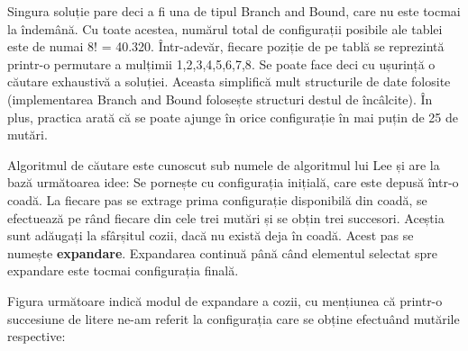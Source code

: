 \inputminted{pascal}{src/problem3-1.pas}

Singura soluție pare deci a fi una de tipul Branch and Bound, care nu este
tocmai la îndemână. Cu toate acestea, numărul total de configurații posibile
ale tablei este de numai 8! = 40.320. Într-adevăr, fiecare poziție de pe tablă
se reprezintă printr-o permutare a mulțimii {1,2,3,4,5,6,7,8}. Se poate face
deci cu ușurință o căutare exhaustivă a soluției. Aceasta simplifică mult
structurile de date folosite (implementarea Branch and Bound folosește
structuri destul de încâlcite). În plus, practica arată că se poate ajunge în
orice configurație în mai puțin de 25 de mutări.

Algoritmul de căutare este cunoscut sub numele de algoritmul lui Lee și are la
bază următoarea idee: Se pornește cu configurația inițială, care este depusă
într-o coadă. La fiecare pas se extrage prima configurație disponibilă din
coadă, se efectuează pe rând fiecare din cele trei mutări și se obțin trei
succesori. Aceștia sunt adăugați la sfârșitul cozii, dacă nu există deja în
coadă. Acest pas se numește {\bf expandare}. Expandarea continuă până când
elementul selectat spre expandare este tocmai configurația finală.

Figura următoare indică modul de expandare a cozii, cu mențiunea că printr-o
succesiune de litere ne-am referit la configurația care se obține efectuând
mutările respective:

